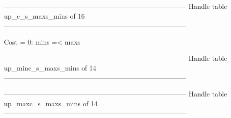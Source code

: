 --------------------------------------------------------------------------------
Handle table up_c_s_maxs_mins of 16
--------------------------------------------------------------------------------

Cost =  0:  mins =< maxs

--------------------------------------------------------------------------------
Handle table up_minc_s_maxs_mins of 14
--------------------------------------------------------------------------------


--------------------------------------------------------------------------------
Handle table up_maxc_s_maxs_mins of 14
--------------------------------------------------------------------------------
